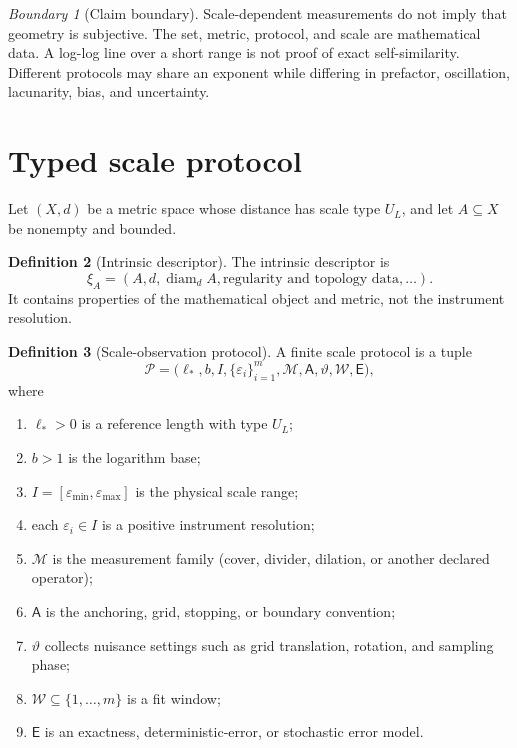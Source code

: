 \documentclass[11pt,a4paper]{article}
\theoremstyle{definition}
\newtheorem{definition}{Definition}[section]
\theoremstyle{plain}
\theoremstyle{remark}
\newtheorem{warning}[definition]{Boundary}
\newcommand{\Pcal}{\mathcal{P}}
\newcommand{\Mcal}{\mathcal{M}}
\newcommand{\Wcal}{\mathcal{W}}
\newcommand{\diam}{\operatorname{diam}}
\begin{document}
\begin{warning}[Claim boundary]
Scale-dependent measurements do not imply that geometry is subjective.
The set, metric, protocol, and scale are mathematical data. A log-log
line over a short range is not proof of exact self-similarity. Different
protocols may share an exponent while differing in prefactor,
oscillation, lacunarity, bias, and uncertainty.
\end{warning}

\section{Typed scale protocol}

Let $(X,d)$ be a metric space whose distance has scale type $U_L$, and let
$A\subseteq X$ be nonempty and bounded.

\begin{definition}[Intrinsic descriptor]
The intrinsic descriptor is
\[
 \xi_A=(A,d,\diam_d A,\text{regularity and topology data},\ldots).
\]
It contains properties of the mathematical object and metric, not the
instrument resolution.
\end{definition}

\begin{definition}[Scale-observation protocol]
A finite scale protocol is a tuple
\[
\Pcal=
\bigl(
\ell_*,b,I,\{\varepsilon_i\}_{i=1}^m,
\Mcal,\mathsf A,
\vartheta,\Wcal,\mathsf E
\bigr),
\]
where
\begin{enumerate}[label=(\roman*)]
\item $\ell_*>0$ is a reference length with type $U_L$;
\item $b>1$ is the logarithm base;
\item $I=[\varepsilon_{\min},\varepsilon_{\max}]$ is the physical scale
      range;
\item each $\varepsilon_i\in I$ is a positive instrument resolution;
\item $\Mcal$ is the measurement family (cover, divider, dilation, or
      another declared operator);
\item $\mathsf A$ is the anchoring, grid, stopping, or boundary
      convention;
\item $\vartheta$ collects nuisance settings such as grid translation,
      rotation, and sampling phase;
\item $\Wcal\subseteq\{1,\ldots,m\}$ is a fit window;
\item $\mathsf E$ is an exactness, deterministic-error, or stochastic
      error model.
\end{enumerate}
\end{definition}
\end{document}
